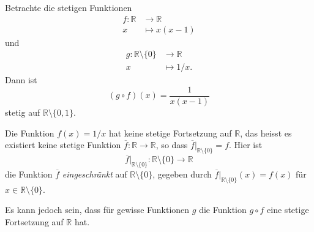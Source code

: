 \documentclass[../main.tex]{subfiles}
\begin{document}
\begin{example}
  Betrachte die stetigen Funktionen
  \begin{align*}
    f \colon \mathbb{R} & \to \mathbb{R} \\
    x & \mapsto x(x-1)
  \end{align*}
  und
  \begin{align*}
    g \colon \mathbb{R} \setminus \{0\} & \to \mathbb{R} \\
     x & \mapsto 1/x.
  \end{align*}
  Dann ist
  \[
    (g \circ f)(x) = \frac{1}{x(x-1)}
  \]
  stetig auf $\mathbb{R} \setminus \{0, 1\}$.
\end{example}


\begin{remark}
  Die Funktion $f(x) = 1/x$ hat keine
  stetige Fortsetzung auf $\mathbb{R}$,
  das heisst es existiert keine stetige
  Funktion $\overline f \colon \mathbb{R} \to \mathbb{R}$,
  so dass $\overline f |_{\mathbb{R} \setminus \{0\}} = f$.
  Hier ist \[\overline f |_{\mathbb{R} \setminus\{0\}}
  \colon \mathbb{R} \setminus \{0\} \to \mathbb{R}\]
  die Funktion $\overline f$ \emph{eingeschränkt} auf
  $\mathbb{R} \setminus \{0\}$, 
  gegeben durch 
  $\overline f|_{\mathbb{R} \setminus \{0\}}(x) =f(x) $
  für $x \in \mathbb{R} \setminus \{0\}$.
\end{remark}

Es kann jedoch sein, dass für gewisse
Funktionen $g$ die Funktion
$g \circ f$ eine stetige Fortsetzung auf $\mathbb{R}$ hat.
\end{document}
